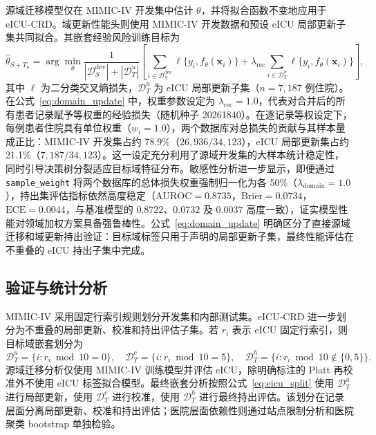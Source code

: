 \documentclass[11pt]{ctexart}
\begin{document}
源域迁移模型仅在 MIMIC-IV 开发集中估计 $\theta$，并将拟合函数不变地应用于 eICU-CRD。域更新性能头则使用 MIMIC-IV 开发数据和预设 eICU 局部更新子集共同拟合。其嵌套经验风险训练目标为
\begin{equation}
\hat{\theta}_{S+T_u}=
\arg\min_{\theta}
\frac{1}{|\mathcal{D}_{S}^{\mathrm{dev}}| + |\mathcal{D}_{T}^{u}|}
\left[
\sum_{i\in \mathcal{D}_{S}^{\mathrm{dev}}}\ell\{y_i,f_{\theta}(\mathbf{x}_i)\}
+
\lambda_{\mathrm{rec}}
\sum_{i\in \mathcal{D}_{T}^{u}}\ell\{y_i,f_{\theta}(\mathbf{x}_i)\}
\right],
\label{eq:domain_update}
\end{equation}
其中 $\ell$ 为二分类交叉熵损失，$\mathcal{D}_{T}^{u}$ 为 eICU 局部更新子集（$n = 7{,}187$ 例住院）。在公式~\ref{eq:domain_update} 中，权重参数设定为 $\lambda_{\mathrm{rec}} = 1.0$，代表对合并后的所有患者记录赋予等权重的经验损失（随机种子 20261840）。在逐记录等权设定下，每例患者住院具有单位权重（$w_i = 1.0$），两个数据库对总损失的贡献与其样本量成正比：MIMIC-IV 开发集占约 78.9\%（$26{,}936 / 34{,}123$），eICU 局部更新集占约 21.1\%（$7{,}187 / 34{,}123$）。这一设定充分利用了源域开发集的大样本统计稳定性，同时引导决策树分裂适应目标域特征分布。敏感性分析进一步显示，即便通过 \texttt{sample\_weight} 将两个数据库的总体损失权重强制归一化为各 50\%（$\lambda_{\mathrm{domain}} = 1.0$），持出集评估指标依然高度稳定（$\text{AUROC} = 0.8735$，$\text{Brier} = 0.0734$，$\text{ECE} = 0.0044$，与基准模型的 $0.8722$、$0.0732$ 及 $0.0037$ 高度一致），证实模型性能对领域加权方案具备强鲁棒性。公式~\ref{eq:domain_update} 明确区分了直接源域迁移和域更新持出验证：目标域标签只用于声明的局部更新子集，最终性能评估在不重叠的 eICU 持出子集中完成。

\subsection{验证与统计分析}
MIMIC-IV 采用固定行索引规则划分开发集和内部测试集。eICU-CRD 进一步划分为不重叠的局部更新、校准和持出评估子集。若 $r_i$ 表示 eICU 固定行索引，则目标域嵌套划分为
\begin{equation}
\mathcal{D}_{T}^{u}=\{i:r_i\bmod 10=0\},\quad
\mathcal{D}_{T}^{c}=\{i:r_i\bmod 10=5\},\quad
\mathcal{D}_{T}^{h}=\{i:r_i\bmod 10\notin\{0,5\}\}.
\label{eq:eicu_split}
\end{equation}
源域迁移分析仅使用 MIMIC-IV 训练模型并评估 eICU，除明确标注的 Platt 再校准外不使用 eICU 标签拟合模型。最终嵌套分析按照公式~\ref{eq:eicu_split} 使用 $\mathcal{D}_{T}^{u}$ 进行局部更新，使用 $\mathcal{D}_{T}^{c}$ 进行校准，使用 $\mathcal{D}_{T}^{h}$ 进行最终持出评估。该划分在记录层面分离局部更新、校准和持出评估；医院层面依赖性则通过站点限制分析和医院聚类 bootstrap 单独检验。
\end{document}
